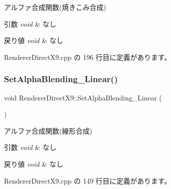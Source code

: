 アルファ合成関数(焼きこみ合成) 


\begin{DoxyParams}{引数}
{\em void} & なし \\
\hline
\end{DoxyParams}

\begin{DoxyRetVals}{戻り値}
{\em void} & なし \\
\hline
\end{DoxyRetVals}


 Renderer\+Direct\+X9.\+cpp の 196 行目に定義があります。

\mbox{\label{class_renderer_direct_x9_abfb5264cbb0bf3bacc7b4ec416ddc05a}} 
\subsubsection{\texorpdfstring{Set\+Alpha\+Blending\+\_\+\+Linear()}{SetAlphaBlending\_Linear()}}
{\footnotesize\ttfamily void Renderer\+Direct\+X9\+::\+Set\+Alpha\+Blending\+\_\+\+Linear (\begin{DoxyParamCaption}{ }\end{DoxyParamCaption})}



アルファ合成関数(線形合成) 


\begin{DoxyParams}{引数}
{\em void} & なし \\
\hline
\end{DoxyParams}

\begin{DoxyRetVals}{戻り値}
{\em void} & なし \\
\hline
\end{DoxyRetVals}


 Renderer\+Direct\+X9.\+cpp の 149 行目に定義があります。

\mbox{\label{class_renderer_direct_x9_a75dbeaa680610e655c6ff202591f50d7}} 
